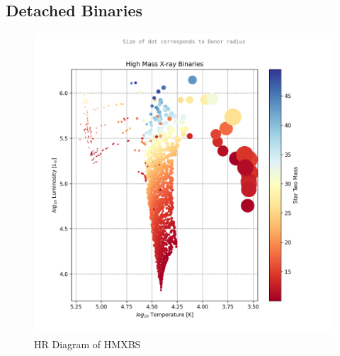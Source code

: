 \documentclass[12pt, a4paper]{article}
\begin{document}
        \subsection{\centering Detached Binaries}
            \begin{figure}[H] 
                \centering
                \includegraphics[scale = .6]{figs/GeneratedFigs/ High Mass X-ray Binaries Star Two Mass log10 F star radius T.png}
                \caption{HR Diagram of HMXBS}
                \label{DetachedBinaryHRDiagram}
            \end{figure}
\end{document}
